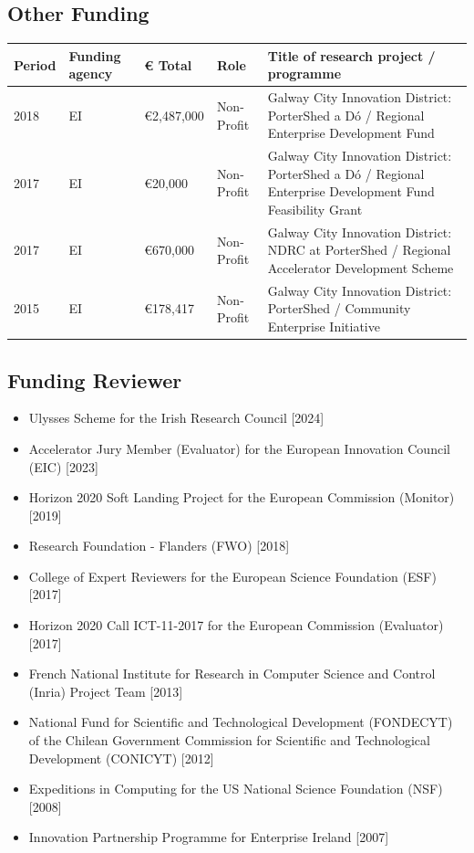 \documentclass[10pt,a4paper]{res} %
\begin{document}
\begin{resume}
\subsection*{Other Funding}

\begin{tabular}{ p{2 cm} | p{2 cm} | p{2 cm} | p{2 cm} | p{7 cm} }
Period & Funding agency & \euro{} Total & Role & Title of research project / programme \\
\hline
2018 & EI & \euro{}2,487,000 & Non-Profit & Galway City Innovation District: PorterShed a D\'{o} / Regional Enterprise Development Fund \\
2017 & EI & \euro{}20,000 & Non-Profit & Galway City Innovation District: PorterShed a D\'{o} / Regional Enterprise Development Fund Feasibility Grant \\
2017 & EI & \euro{}670,000 & Non-Profit & Galway City Innovation District: NDRC at PorterShed / Regional Accelerator Development Scheme \\
2015 & EI & \euro{}178,417 & Non-Profit & Galway City Innovation District: PorterShed / Community Enterprise Initiative \\
\end{tabular}

\subsection*{Funding Reviewer}

\begin{itemize} \itemsep -2pt
\item Ulysses Scheme for the Irish Research Council [2024]
\item Accelerator Jury Member (Evaluator) for the European Innovation Council (EIC) [2023]
\item Horizon 2020 Soft Landing Project for the European Commission (Monitor) [2019]
\item Research Foundation - Flanders (FWO) [2018]
\item College of Expert Reviewers for the European Science Foundation (ESF) [2017]
\item Horizon 2020 Call ICT-11-2017 for the European Commission (Evaluator) [2017]
\item French National Institute for Research in Computer Science and Control (Inria) Project Team [2013]
\item National Fund for Scientific and Technological Development (FONDECYT) of the Chilean Government Commission for Scientific and Technological Development (CONICYT) [2012]
\item Expeditions in Computing for the US National Science Foundation (NSF) [2008]
\item Innovation Partnership Programme for Enterprise Ireland [2007]
\end{itemize}


\end{resume}
\end{document}
